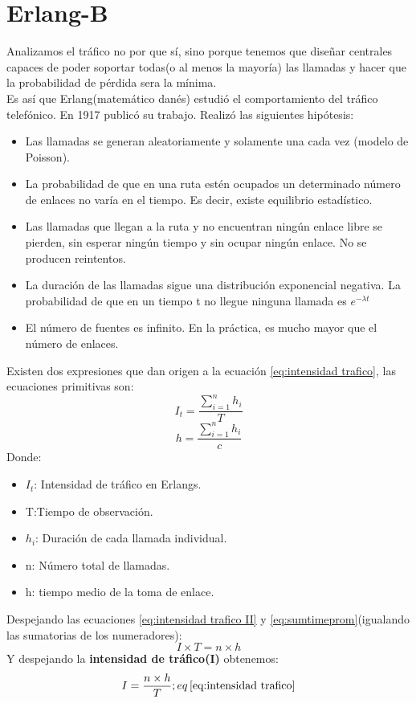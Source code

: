 \documentclass[
	12pt, %
	fleqn, %
	a4paper, %
	oneside, %
]{LegrandOrangeBook}
\begin{document}
\section{Erlang-B}
Analizamos el tráfico no por que sí, sino porque tenemos que diseñar centrales capaces de poder soportar todas(o al menos la mayoría) las llamadas y hacer que la probabilidad de pérdida sera la mínima.\\
Es así que Erlang(matemático danés) estudió el comportamiento del tráfico telefónico. En 1917 publicó su trabajo. Realizó las siguientes hipótesis:
\begin{itemize}
\item Las llamadas se generan aleatoriamente y solamente una cada vez (modelo de  Poisson).
\item La probabilidad de que en una ruta estén ocupados un determinado número de enlaces no varía en el tiempo.  Es decir, existe equilibrio estadístico. 
\item Las llamadas que llegan a la ruta y no encuentran ningún enlace libre se pierden, sin esperar ningún tiempo y sin ocupar ningún enlace.  No se producen reintentos. 
\item La duración de las llamadas sigue una distribución exponencial negativa.  La probabilidad de que en un tiempo t no llegue ninguna llamada es $e^{-\lambda t}$ 
\item El número de fuentes es infinito.  En la práctica, es mucho mayor que el número de enlaces.
\end{itemize}
\begin{definition}
Existen dos expresiones que dan origen a la ecuación \ref{eq:intensidad trafico}, las ecuaciones primitivas son:
\begin{equation}\label{eq:intensidad trafico II}
I_t=\frac{\sum_{i=1}^{n}h_i}{T}
\end{equation}
\begin{equation}\label{eq:sumtimeprom}
h=\frac{\sum_{i=1}^{n}h_i}{c}
\end{equation}
Donde:
\begin{itemize}
\item $I_t$: Intensidad de tráfico en Erlangs.
\item T:Tiempo de observación.
\item $h_i$: Duración de cada llamada individual. 
\item n: Número total de llamadas.
\item h: tiempo medio de la toma de enlace.
\end{itemize}
\end{definition}
Despejando las ecuaciones \ref{eq:intensidad trafico II} y \ref{eq:sumtimeprom}(igualando las sumatorias de los numeradores):
\begin{equation*}
I\times T=n\times h
\end{equation*}
Y despejando la \textbf{intensidad de tráfico(I)} obtenemos:
\begin{displaymath}
I=\frac{n\times h}{T}; eq\thinspace\ref{eq:intensidad trafico}
\end{displaymath}
\end{document}
